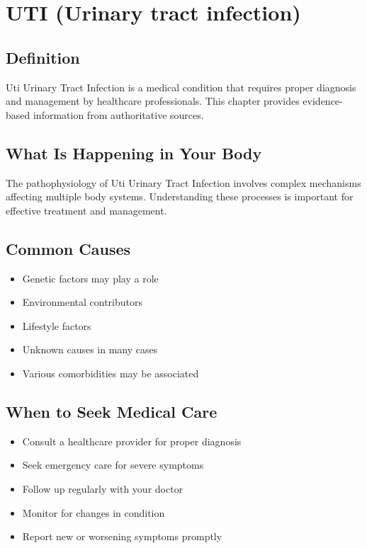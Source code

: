 
\chapter{UTI (Urinary tract infection)}

\section*{Definition}
Uti Urinary Tract Infection is a medical condition that requires proper diagnosis and management by healthcare professionals. This chapter provides evidence-based information from authoritative sources.

\section*{What Is Happening in Your Body}
The pathophysiology of Uti Urinary Tract Infection involves complex mechanisms affecting multiple body systems. Understanding these processes is important for effective treatment and management.

\section*{Common Causes}
\begin{itemize}
  \item Genetic factors may play a role
  \item Environmental contributors
  \item Lifestyle factors
  \item Unknown causes in many cases
  \item Various comorbidities may be associated
\end{itemize}

\section*{When to Seek Medical Care}
\begin{itemize}
  \item Consult a healthcare provider for proper diagnosis
  \item Seek emergency care for severe symptoms
  \item Follow up regularly with your doctor
  \item Monitor for changes in condition
  \item Report new or worsening symptoms promptly
\end{itemize}

